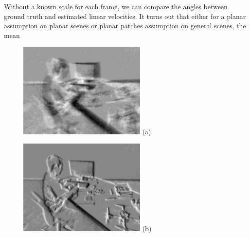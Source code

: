   Without a known scale for each frame, we can compare the angles
  between ground truth and estimated linear velocities. It turns out
  that either for a planar assumption on planar scenes or planar
  patches assumption on general scenes, the mean
  \begin{figure}[H]
    \begin{minipage}[t]{0.48\textwidth}
      \centering \includegraphics[width =
      \textwidth]{images/zero_motion_934.jpg} (a)
    \end{minipage}
    \hfill
    \begin{minipage}[t]{0.48\textwidth}
      \centering \includegraphics[width =
      \textwidth]{images/optimized_934.jpg} (b)
    \end{minipage}

\end{figure}
